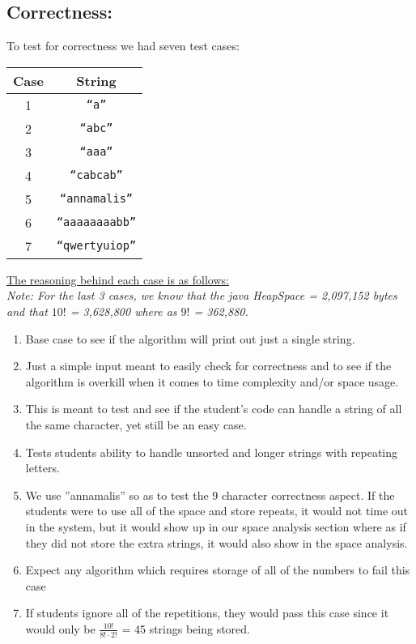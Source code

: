 \documentclass[12pt]{article}
\begin{document}
\subsection{Correctness:}
To test for correctness we had seven test cases:
\begin{table}[H]
	\centering
	\begin{tabular}{cc}
		\toprule
		Case & String \\
		\midrule
		1 & \texttt{``a''} \\
		2 & \texttt{``abc''} \\
		3 & \texttt{``aaa''} \\
		4 & \texttt{``cabcab''} \\
		5 & \texttt{``annamalis''} \\
		6 & \texttt{``aaaaaaaabb''} \\
		7 & \texttt{``qwertyuiop''} \\
		\bottomrule
	\end{tabular}
\end{table}
\noindent \underline{The reasoning behind each case is as follows:} \\
\em{Note: For the last 3 cases, we know that the java HeapSpace = 2,097,152 bytes and that $10!$ = 3,628,800
    where as $9!$ = 362,880.}
\begin{enumerate}
\item Base case to see if the algorithm will print out just a single string.
\item Just a simple input meant to easily check for correctness and to see if the
algorithm is overkill when it comes to time complexity and/or space usage.
\item This is meant to test and see if the student's code can handle a string of all
the same character, yet still be an easy case.
\item Tests students ability to handle unsorted and longer strings with repeating letters.
\item We use ''annamalis'' so as to test the 9 character correctness aspect. If the students
were to use all of the space and store repeats, it would not time out in the system, but it
would show up in our space analysis section where as if they did not store the extra
strings, it would also show in the space analysis.
\item Expect any algorithm which requires storage of all of the numbers to fail this case
\item If students ignore all of the repetitions, they would pass this case since it would only be $\frac{10!}{8!\cdot 2!}$ = 45 strings being stored.
\end{enumerate}
\end{document}
